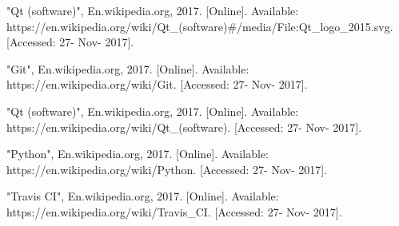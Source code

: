 \begin{thebibliography}{22}
\bibitem{} "Qt (software)", En.wikipedia.org, 2017. [Online]. Available: https://en.wikipedia.org/wiki/Qt\_(software)\#/media/File:Qt\_logo\_2015.svg. [Accessed: 27- Nov- 2017].

\bibitem{} "Git", En.wikipedia.org, 2017. [Online]. Available: 
https://en.wikipedia.org/wiki/Git. [Accessed: 27- Nov- 2017].

\bibitem{}"Qt (software)", En.wikipedia.org, 2017. [Online]. Available: https://en.wikipedia.org/wiki/Qt\_(software). [Accessed: 27- Nov- 2017].

\bibitem{} "Python", En.wikipedia.org, 2017. [Online]. Available: https://en.wikipedia.org/wiki/Python. [Accessed: 27- Nov- 2017].

\bibitem{}"Travis CI", En.wikipedia.org, 2017. [Online]. Available: https://en.wikipedia.org/wiki/Travis\_CI. [Accessed: 27- Nov- 2017].

\end{thebibliography}
